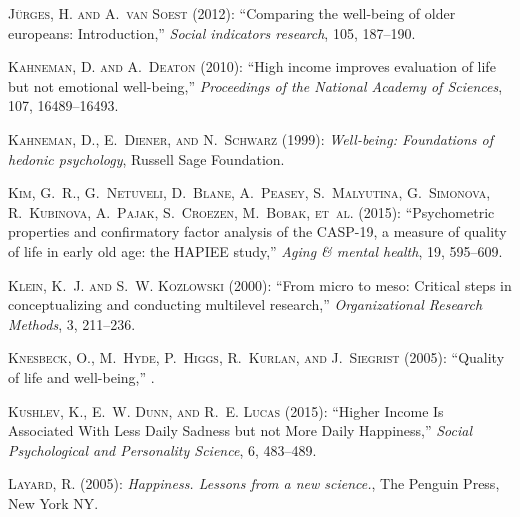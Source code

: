 \textsc{J{\"u}rges, H. and A.~van Soest} (2012): \enquote{Comparing the
  well-being of older europeans: Introduction,} \emph{Social indicators
  research}, 105, 187--190.

\textsc{Kahneman, D. and A.~Deaton} (2010): \enquote{High income improves
  evaluation of life but not emotional well-being,} \emph{Proceedings of the
  National Academy of Sciences}, 107, 16489--16493.

\textsc{Kahneman, D., E.~Diener, and N.~Schwarz} (1999): \emph{Well-being:
  Foundations of hedonic psychology}, Russell Sage Foundation.

\textsc{Kim, G.~R., G.~Netuveli, D.~Blane, A.~Peasey, S.~Malyutina,
  G.~Simonova, R.~Kubinova, A.~Pajak, S.~Croezen, M.~Bobak, et~al.} (2015):
  \enquote{Psychometric properties and confirmatory factor analysis of the
  CASP-19, a measure of quality of life in early old age: the HAPIEE study,}
  \emph{Aging \& mental health}, 19, 595--609.

\textsc{Klein, K.~J. and S.~W. Kozlowski} (2000): \enquote{From micro to meso:
  Critical steps in conceptualizing and conducting multilevel research,}
  \emph{Organizational Research Methods}, 3, 211--236.

\textsc{Knesbeck, O., M.~Hyde, P.~Higgs, R.~Kurlan, and J.~Siegrist} (2005):
  \enquote{Quality of life and well-being,} .

\textsc{Kushlev, K., E.~W. Dunn, and R.~E. Lucas} (2015): \enquote{Higher
  Income Is Associated With Less Daily Sadness but not More Daily Happiness,}
  \emph{Social Psychological and Personality Science}, 6, 483--489.

\textsc{Layard, R.} (2005): \emph{Happiness. Lessons from a new science.}, The
  Penguin Press, New York NY.

